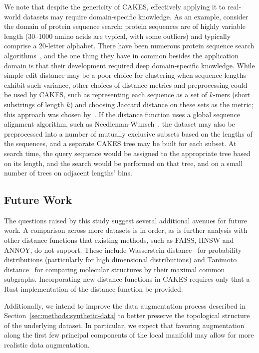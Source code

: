 We note that despite the genericity of CAKES, effectively applying it to real-world datasets may require domain-specific knowledge.
As an example, consider the domain of protein sequence search; protein sequences are of highly variable length (30--1000 amino acids are typical, with some outliers) and typically comprise a 20-letter alphabet.
There have been numerous protein sequence search algorithms~\cite{kim2021entrance, daniels2013compressive, yu2015entropy, steinegger2018clustering}, and the one thing they have in common besides the application domain is that their development required deep domain-specific knowledge.
While simple edit distance may be a poor choice for clustering when sequence lengths exhibit such variance, other choices of distance metrics and preprocessing could be used by CAKES, such as representing each sequence as a set of $k$-mers (short substrings of length $k$) and choosing Jaccard distance on these sets as the metric; this approach was chosen by~\cite{kim2021entrance}.
If the distance function uses a global sequence alignment algorithm, such as Needleman-Wunsch~\cite{needleman1970general}, the dataset may also be preprocessed into a number of mutually exclusive subsets based on the lengths of the sequences, and a separate CAKES tree may be built for each subset.
At search time, the query sequence would be assigned to the appropriate tree based on its length, and the search would be performed on that tree, and on a small number of trees on adjacent lengths' bins.

\subsection{Future Work}

The questions raised by this study suggest several additional avenues for future work.
A comparison across more datasets is in order, as is further analysis with other distance functions that existing methods, such as FAISS, HNSW and ANNOY, do not support.
These include Wasserstein distance~\cite{vallender1974calculation} for probability distributions (particularly for high dimensional distributions) and Tanimoto distance~\cite{bajusz2015tanimoto} for comparing molecular structures by their maximal common subgraphs.
Incorporating new distance functions in CAKES requires only that a Rust implementation of the distance function be provided.

Additionally, we intend to improve the data augmentation process described in Section~\ref{sec:methods:synthetic-data} to better preserve the topological structure of the underlying dataset.
In particular, we expect that favoring augmentation along the first few principal components of the local manifold may allow for more realistic data augmentation.


